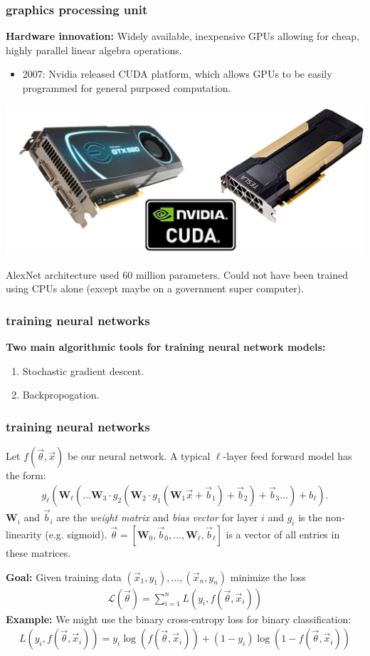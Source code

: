 \documentclass[handout,compress]{beamer}
\newcommand{\bv}[1]{\mathbf{#1}}
\begin{document}
\begin{frame}
	\frametitle{graphics processing unit}
	\textbf{Hardware innovation:} Widely available, inexpensive GPUs allowing for cheap, highly parallel linear algebra operations.
	
	\begin{itemize}
		\item 2007: Nvidia released CUDA platform, which allows GPUs to be easily programmed for general purposed computation.
	\end{itemize}
\begin{center}
	\includegraphics[width=.6\textwidth]{gpus.png}
\end{center}
AlexNet architecture used 60 million parameters. Could not have been trained using CPUs alone (except maybe on a government super computer).  
\end{frame}

\begin{frame}
	\frametitle{training neural networks}
	\textbf{Two main algorithmic tools for training neural network models:}
	\begin{enumerate}
		\item Stochastic gradient descent.
		\item Backpropogation.
	\end{enumerate}
\end{frame}

\begin{frame}
	\frametitle{training neural networks}
	Let $f(\vec{\theta},\vec{x})$ be our neural network. A typical $\ell$-layer feed forward model has the form:
	\begin{align*}
	g_{\ell}\left(\bv{W}_\ell\left(\ldots \bv{W}_3 \cdot g_2 \left(\bv{W}_2 \cdot g_1\left(\bv{W}_1\vec{x} + \vec{b}_1\right) + \vec{b}_2\right)+ \vec{b}_3 \ldots \right) + b_\ell\right).
	\end{align*} 
	$\bv{W}_{i}$ and $\vec{b}_i$ are the \emph{weight matrix} and \emph{bias vector} for layer $i$ and $g_i$ is the non-linearity (e.g. sigmoid). $\vec{\theta} = [\bv{W}_0,\vec{b}_0, \ldots,\bv{W}_\ell,\vec{b}_\ell]$ is a vector of all entries in these matrices.
	
	\textbf{Goal:} Given training data $(\vec{x}_1, y_1),\ldots,(\vec{x}_n, y_n)$ minimize the loss
	\begin{align*}
	\mathcal{L}(\vec{\theta}) = \sum_{i=1}^n L\left(y_i,f(\vec{\theta}, \vec{x}_i)\right)
	\end{align*}
	\textbf{Example:} We might use the binary cross-entropy loss for binary classification:
	\begin{align*}
		L\left(y_i,f(\vec{\theta}, \vec{x}_i)\right) = y_i\log(f(\vec{\theta},\vec{x}_i)) + (1-y_i)\log(1 - f(\vec{\theta}, \vec{x}_i))
	\end{align*}
\end{frame}
\end{document}
